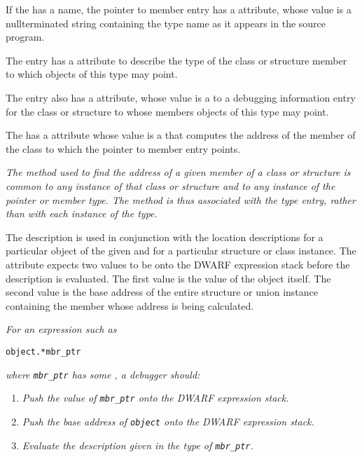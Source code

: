 If the  has a name, the 
pointer to member entry has a
\DWATname{} attribute, 
whose value is a
null\dash terminated string containing the type name as it appears
in the source program.

The  entry 
has 
a \DWATtype{} attribute to
describe the type of the class or structure member to which
objects of this type may point.

The  entry also 
\hypertarget{chap:DWATcontainingtypecontainingtypeofpointertomembertype}{}
has a 
\DWATcontainingtype{}
attribute, whose value is a  to a debugging
information entry for the class or structure to whose members
objects of this type may point.

The  
\hypertarget{chap:DWATuselocationmemberlocationforpointertomembertype}{}
has a 
\DWATuselocation{} attribute
whose value is a 
 that computes the
address of the member of the class to which the pointer to
member entry points.

\textit{The method used to find the address of a given member of a
class or structure is common to any instance of that class
or structure and to any instance of the pointer or member
type. The method is thus associated with the type entry,
rather than with each instance of the type.}

The \DWATuselocation{} description is used in conjunction
with the location descriptions for a particular object of the
given  and for a particular structure or
class instance. The \DWATuselocation{} 
attribute expects two values to be 
onto the DWARF expression stack before
the \DWATuselocation{} description is evaluated.
The first value 
is the value of the  object
itself. The second value 
is the base address of the
entire structure or union instance containing the member
whose address is being calculated.

\textit{For an expression such as}

\begin{lstlisting}[numbers=none]
    object.*mbr_ptr
\end{lstlisting}
\textit{where \texttt{mbr\_ptr} has some , a debugger should:}
\begin{enumerate}[1. ]
\item \textit{Push the value of \texttt{mbr\_ptr} onto the DWARF expression stack.}
\item \textit{Push the base address of \texttt{object} onto the DWARF expression stack.}
\item \textit{Evaluate the \DWATuselocation{} description 
given in the type of \texttt{mbr\_ptr}.}
\end{enumerate}


